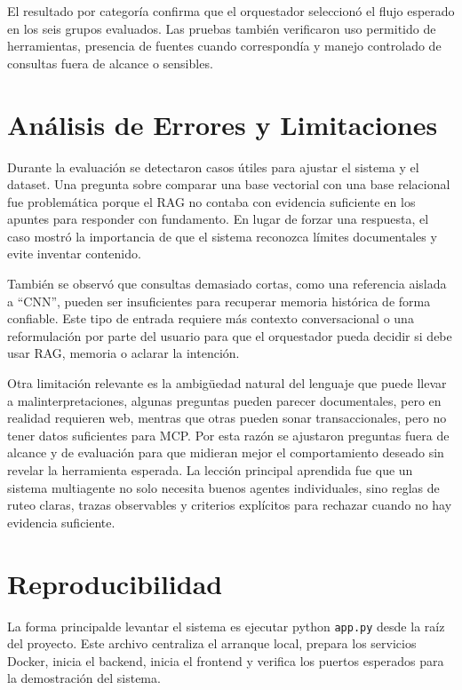 \documentclass[conference]{IEEEtran}
\begin{document}
El resultado por categoría confirma que el orquestador seleccionó el flujo esperado en los seis grupos evaluados. Las pruebas también verificaron uso permitido de herramientas, presencia de fuentes cuando correspondía y manejo controlado de consultas fuera de alcance o sensibles.
\section{Análisis de Errores y Limitaciones}

Durante la evaluación se detectaron casos útiles para ajustar el sistema y el dataset. Una pregunta sobre comparar una base vectorial con una base relacional fue problemática porque el RAG no contaba con evidencia suficiente en los apuntes para responder con fundamento. En lugar de forzar una respuesta, el caso mostró la importancia de que el sistema reconozca límites documentales y evite inventar contenido.

También se observó que consultas demasiado cortas, como una referencia aislada a ``CNN'', pueden ser insuficientes para recuperar memoria histórica de forma confiable. Este tipo de entrada requiere más contexto conversacional o una reformulación por parte del usuario para que el orquestador pueda decidir si debe usar RAG, memoria o aclarar la intención.

Otra limitación relevante es la ambigüedad natural del lenguaje que puede llevar a malinterpretaciones, algunas preguntas pueden parecer documentales, pero en realidad requieren web, mentras que otras pueden sonar transaccionales, pero no tener datos suficientes para MCP. Por esta razón se ajustaron preguntas fuera de alcance y de evaluación para que midieran mejor el comportamiento deseado sin revelar la herramienta esperada. La lección principal aprendida fue que un sistema multiagente no solo necesita buenos agentes individuales, sino reglas de ruteo claras, trazas observables y criterios explícitos para rechazar cuando no hay evidencia suficiente.

\section{Reproducibilidad}

La forma  principalde levantar el sistema es ejecutar python \texttt{app.py} desde la raíz del proyecto. Este archivo centraliza el arranque local, prepara los servicios Docker, inicia el backend, inicia el frontend y verifica los puertos esperados para la demostración del sistema.
\end{document}

